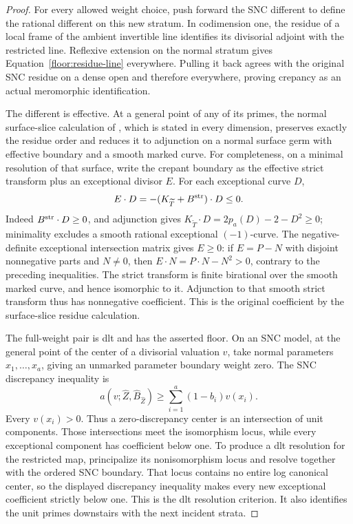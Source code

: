 \begin{proof}
For every allowed weight choice, push forward the SNC different to define
the rational different on this new stratum.  In codimension one, the residue of a local frame of the
ambient invertible line identifies its divisorial adjoint with the
restricted line.  Reflexive extension on the normal stratum gives
Equation~\eqref{floor:residue-line} everywhere.  Pulling it back agrees with the
original SNC residue on a dense open and therefore everywhere, proving
crepancy as an actual meromorphic identification.

The different is effective.  At a general point of any of its primes,
the normal surface-slice calculation of \cite[Lemma~6.2]{BL}, which is
stated in every dimension, preserves exactly the residue order and reduces
it to adjunction on a normal surface germ with effective boundary and a
smooth marked curve.  For completeness, on a minimal resolution of that
surface, write the crepant boundary as the effective strict transform plus
an exceptional divisor \(E\).  For each exceptional curve \(D\),
\[
 E\cdot D=-(K_{\widetilde T}+B^{\rm str})\cdot D\leq0.
\]
Indeed \(B^{\rm str}\cdot D\geq0\), and adjunction gives
\(K_{\widetilde T}\cdot D=2p_a(D)-2-D^2\geq0\); minimality excludes a
smooth rational exceptional \((-1)\)-curve.  The negative-definite
exceptional intersection matrix gives \(E\geq0\): if \(E=P-N\) with
disjoint nonnegative parts and \(N\ne0\), then
\(E\cdot N=P\cdot N-N^2>0\), contrary to the preceding inequalities.
The strict transform is finite birational over the smooth marked curve,
and hence isomorphic to it.  Adjunction to that smooth strict transform
thus has nonnegative coefficient.  This is the original coefficient by the
surface-slice residue calculation.

The full-weight pair is dlt and has the asserted floor.  On an SNC model,
at the general point of the center of a divisorial valuation \(v\), take
normal parameters \(x_1,\ldots,x_a\), giving an unmarked parameter boundary
weight zero.  The SNC discrepancy inequality is
\[
 a(v;\widehat Z,\widehat B_{\widehat Z})
       \geq \sum_{i=1}^a(1-b_i)v(x_i).
\]
Every \(v(x_i)>0\).  Thus a zero-discrepancy center is an intersection
of unit components.  Those intersections meet the isomorphism locus,
while every exceptional component has coefficient below one.  To produce
a dlt resolution for the restricted map, principalize its nonisomorphism
locus and resolve together with the ordered SNC boundary.  That locus
contains no entire log canonical center, so the displayed discrepancy
inequality makes every new exceptional coefficient strictly below one.
This is the dlt resolution criterion.  It also identifies the unit primes
downstairs with the next incident strata.


\end{proof}
